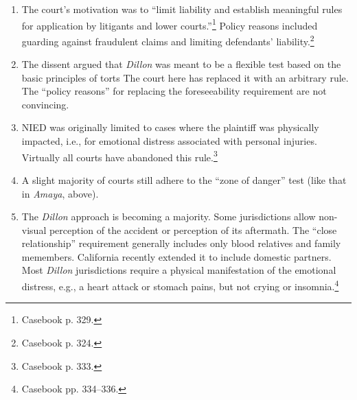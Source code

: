 \begin{enumerate}
\begin{enumerate}
    \end{enumerate}
    \item The court's motivation was to ``limit liability and establish meaningful rules for application by litigants and lower courts.''\footnote{Casebook p. 329.} Policy reasons included guarding against fraudulent claims and limiting defendants' liability.\footnote{Casebook p. 324.}
    \item The dissent argued that \emph{Dillon} was meant to be a flexible test based on the basic principles of torts The court here has replaced it with an arbitrary rule. The ``policy reasons'' for replacing the foreseeability requirement are not convincing.
    \item NIED was originally limited to cases where the plaintiff was physically impacted, i.e., for emotional distress associated with personal injuries. Virtually all courts have abandoned this rule.\footnote{Casebook p. 333.}
    \item A slight majority of courts still adhere to the ``zone of danger'' test (like that in \emph{Amaya}, above).
    \item The \emph{Dillon} approach is becoming a majority. Some jurisdictions allow non-visual perception of the accident or perception of its aftermath. The ``close relationship'' requirement generally includes only blood relatives and family memembers. California recently extended it to include domestic partners. Most \emph{Dillon} jurisdictions require a physical manifestation of the emotional distress, e.g., a heart attack or stomach pains, but not crying or insomnia.\footnote{Casebook pp. 334--336.}
\end{enumerate}

%
%
%
